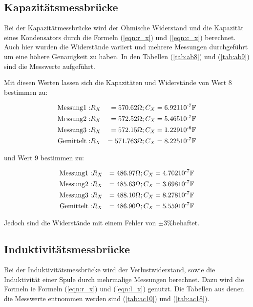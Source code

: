 \subsection{Kapazitätsmessbrücke}

Bei der Kapazitätmessbrücke wird der Ohmische Widerstand und die Kapazität eines Kondensators durch die Formeln (\ref{eqn:r_x}) und (\ref{eqn:c_x}) berechnet. Auch hier wurden die 
Widerstände variiert und mehrere Messungen durchgeführt um eine höhere Genauigkeit zu haben.
In den Tabellen (\ref{tab:ab8}) und (\ref{tab:ab9}) sind die Messwerte aufgeführt.

Mit diesen Werten lassen sich die Kapazitäten und Widerstände von Wert 8 bestimmen zu:

\begin{align*}
\text{Messung}1:& R_X &= 570.62 \si{\ohm}; C_X &=  6.921 10\textsuperscript{-7} \si{\farad}\\
\text{Messung}2:& R_X &= 572.52 \si{\ohm} ; C_X &= 5.465 10\textsuperscript{-7} \si{\farad}\\
\text{Messung}3:& R_X &= 572.15 \si{\ohm} ; C_X &= 1.229 10\textsuperscript{-6} \si{\farad}\\
\text{Gemittelt}:& R_X &= 571.763 \si{\ohm} ; C_X &= 8.225 10\textsuperscript{-7} \si{\farad}\\
\end{align*}

und Wert 9 bestimmen zu:

\begin{align*}
\text{Messung}1:& R_X &= 486.97 \si{\ohm}; C_X &=  4.702 10\textsuperscript{-7} \si{\farad}\\
\text{Messung}2:& R_X &= 485.63 \si{\ohm} ; C_X &= 3.698 10\textsuperscript{-7} \si{\farad}\\
\text{Messung}3:& R_X &= 488.10 \si{\ohm} ; C_X &= 8.278 10\textsuperscript{-7} \si{\farad}\\
\text{Gemittelt}:& R_X &= 486.90 \si{\ohm} ; C_X &= 5.559 10\textsuperscript{-7} \si{\farad}\\
\end{align*}

Jedoch sind die Widerstände mit einem Fehler von $\pm 3\% $behaftet.

\subsection{Induktivitätsmessbrücke}

Bei der Induktivitätsmessbrücke wird der Verlustwiderstand, sowie die Induktivität einer Spule durch mehrmalige Messungen berechnet. Dazu wird die Formeln ie Formeln (\ref{eqn:r_x}) 
und (\ref{eqn:l_x}) genutzt. Die Tabellen aus denen die Messwerte entnommen werden sind (\ref{tab:ac10}) und (\ref{tab:ac18}).

